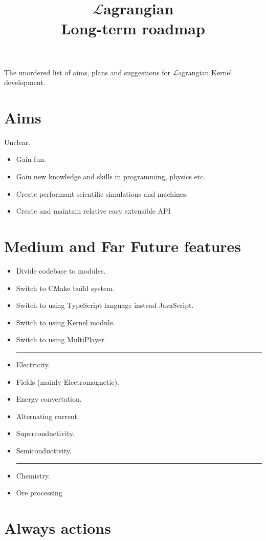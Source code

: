 \documentclass[12pt]{article}
\title{$\mathcal{L}$agrangian \\ Long-term roadmap}
\begin{document}
	\maketitle

	The unordered list of aims, plans and suggestions for $\mathcal{L}$agrangian Kernel development.

	\section{Aims}
	Unclear.
	\begin{itemize}
		\item Gain fun.
		\item Gain new knowledge and skills in programming, physics etc.
		\item Create performant scientific simulations and machines.
		\item Create and maintain relative easy extensible API
	\end{itemize}

	\section{Medium and Far Future features}

	\begin{itemize}
		\item Divide codebase to modules.
		\item Switch to CMake build system.
		\item Switch to using TypeScript language instead JavaScript.
		\item Switch to using Kernel module.
		\item Switch to using MultiPlayer. \\
		\noindent\rule{\textwidth}{0.4pt}
		\item Electricity.
		\item Fields (mainly Electromagnetic).
		\item Energy convertation.
		\item Alternating current.
		\item Superconductivity.
		\item Semiconductivity. \\
		\noindent\rule{\textwidth}{0.4pt}
		\item Chemistry.
		\item Ore processing
	\end{itemize}

	\section{Always actions}
\end{document}
